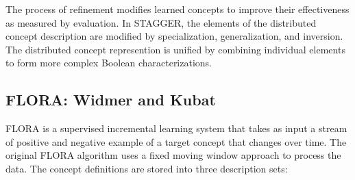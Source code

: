 The process of refinement modifies learned concepts to improve their effectiveness as measured by evaluation. In STAGGER, the elements of the distributed concept description are modified by specialization, generalization, and inversion.
 The distributed concept represention is unified by combining individual elements to form more complex Boolean characterizations.



\subsection{FLORA: Widmer and Kubat}
FLORA \cite {WidmerKubat} is a supervised incremental learning system that
takes as input a stream of positive and negative example of a target concept that changes over
time. The original FLORA algorithm uses a fixed moving window approach to process the data.
The concept definitions are stored into three description sets:

